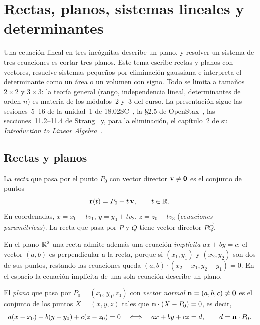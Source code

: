 \chapter{Rectas, planos, sistemas lineales y determinantes}
\label{tema:2}

Una ecuación lineal en tres incógnitas describe un plano, y resolver un sistema de tres ecuaciones es cortar tres planos. Este tema escribe rectas y planos con vectores, resuelve sistemas pequeños por eliminación gaussiana e interpreta el determinante como un área o un volumen con signo. Todo se limita a tamaños $2\times2$ y $3\times3$: la teoría general (rango, independencia lineal, determinantes de orden $n$) es materia de los módulos~2 y~3 del curso. La presentación sigue las sesiones~5--16 de la unidad~1 de 18.02SC~\cite{mit1802}, la §2.5 de OpenStax~\cite{openstax3}, las secciones~11.2--11.4 de Strang~\cite{strangcalc} y, para la eliminación, el capítulo~2 de su \emph{Introduction to Linear Algebra}~\cite{strangla}.

\section{Rectas y planos}

\begin{definicion}[Recta]\label{def:recta}
La \emph{recta} que pasa por el punto $P_0$ con vector director $\mathbf{v}\neq\mathbf{0}$ es el conjunto de puntos
\[
\mathbf{r}(t)=P_0+t\,\mathbf{v},\qquad t\in\mathbb{R} .
\]
En coordenadas, $x=x_0+tv_1$, $y=y_0+tv_2$, $z=z_0+tv_3$ (\emph{ecuaciones paramétricas}). La recta que pasa por $P$ y $Q$ tiene vector director $\overrightarrow{PQ}$.
\end{definicion}

En el plano $\mathbb{R}^2$ una recta admite además una ecuación \emph{implícita} $ax+by=c$; el vector $(a,b)$ es perpendicular a la recta, porque si $(x_1,y_1)$ y $(x_2,y_2)$ son dos de sus puntos, restando las ecuaciones queda $(a,b)\cdot(x_2-x_1,y_2-y_1)=0$. En el espacio la ecuación implícita de una sola ecuación describe un plano.

\begin{definicion}[Plano]\label{def:plano}
El \emph{plano} que pasa por $P_0=(x_0,y_0,z_0)$ con \emph{vector normal} $\mathbf{n}=(a,b,c)\neq\mathbf{0}$ es el conjunto de los puntos $X=(x,y,z)$ tales que $\mathbf{n}\cdot(X-P_0)=0$, es decir,
\[
a(x-x_0)+b(y-y_0)+c(z-z_0)=0\quad\Longleftrightarrow\quad ax+by+cz=d,\qquad d=\mathbf{n}\cdot P_0 .
\]
\end{definicion}

